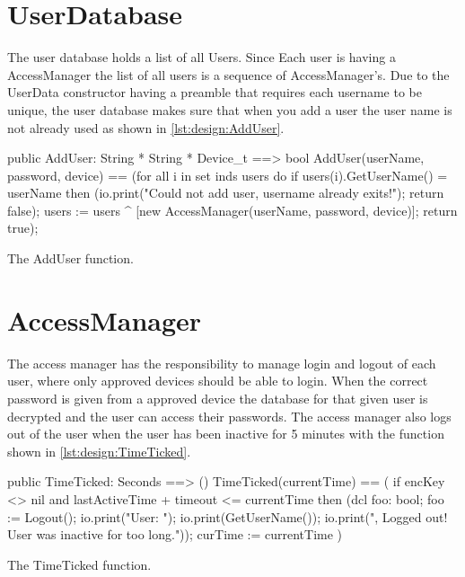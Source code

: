 \section{UserDatabase}
The user database holds a list of all Users. Since Each user is having a {\ttfamily AccessManager} the list of all users is a sequence of {\ttfamily AccessManager}'s. Due to the {\ttfamily UserData} constructor having a preamble that requires each username to be unique, the user database makes sure that when you add a user the user name is not already used as shown in \cref{lst:design:AddUser}.
\begin{listing}[H]
    \begin{vdm_al}
public AddUser: String * String * Device_t ==> bool
    AddUser(userName, password, device) ==
        (for all i in set inds users do
            if users(i).GetUserName() = userName then
                (io.print("Could not add user, username already exits!\n"); 
                 return false);
        users := users ^ [new AccessManager(userName, password, device)];
        return true);

    \end{vdm_al}
    \caption{The {\ttfamily AddUser} function.}
    \label{lst:design:AddUser}
\end{listing}
\section{AccessManager}
The access manager has the responsibility to manage login and logout of each user, where only approved devices should be able to login. When the correct password is given from a approved device the database for that given user is decrypted and the user can access their passwords. The access manager also logs out of the user when the user has been inactive for 5 minutes with the function shown in \cref{lst:design:TimeTicked}.

\begin{listing}[H]
    \begin{vdm_al}
    public TimeTicked: Seconds ==> ()
    TimeTicked(currentTime) == (
        if encKey <> nil and lastActiveTime + timeout <= currentTime then
            (dcl foo: bool; foo := Logout();
             io.print("User: ");
             io.print(GetUserName());
             io.print(", Logged out! User was inactive for too long.\n"));
        curTime := currentTime
    )
    \end{vdm_al}
    \caption{The {\ttfamily TimeTicked} function.}
    \label{lst:design:TimeTicked}
\end{listing}
